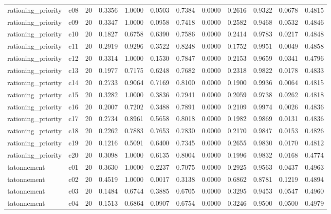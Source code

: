 \begin{table}[htbp]
\begin{tabular}{lrrrrrrrrrrr}
rationing\_priority & c08 & 20 & 0.3356 & 1.0000 & 0.0503 & 0.7384 & 0.0000 & 0.2616 & 0.9322 & 0.0678 & 0.4815 \\
rationing\_priority & c09 & 20 & 0.3347 & 1.0000 & 0.0958 & 0.7418 & 0.0000 & 0.2582 & 0.9468 & 0.0532 & 0.4846 \\
rationing\_priority & c10 & 20 & 0.1827 & 0.6758 & 0.6390 & 0.7586 & 0.0000 & 0.2414 & 0.9783 & 0.0217 & 0.4848 \\
rationing\_priority & c11 & 20 & 0.2919 & 0.9296 & 0.3522 & 0.8248 & 0.0000 & 0.1752 & 0.9951 & 0.0049 & 0.4858 \\
rationing\_priority & c12 & 20 & 0.3314 & 1.0000 & 0.1530 & 0.7847 & 0.0000 & 0.2153 & 0.9659 & 0.0341 & 0.4796 \\
rationing\_priority & c13 & 20 & 0.1977 & 0.7175 & 0.6248 & 0.7682 & 0.0000 & 0.2318 & 0.9822 & 0.0178 & 0.4833 \\
rationing\_priority & c14 & 20 & 0.2733 & 0.9064 & 0.7169 & 0.8100 & 0.0000 & 0.1900 & 0.9936 & 0.0064 & 0.4815 \\
rationing\_priority & c15 & 20 & 0.3282 & 1.0000 & 0.3836 & 0.7941 & 0.0000 & 0.2059 & 0.9738 & 0.0262 & 0.4818 \\
rationing\_priority & c16 & 20 & 0.2007 & 0.7202 & 0.3488 & 0.7891 & 0.0000 & 0.2109 & 0.9974 & 0.0026 & 0.4836 \\
rationing\_priority & c17 & 20 & 0.2734 & 0.8961 & 0.5658 & 0.8018 & 0.0000 & 0.1982 & 0.9869 & 0.0131 & 0.4836 \\
rationing\_priority & c18 & 20 & 0.2262 & 0.7883 & 0.7653 & 0.7830 & 0.0000 & 0.2170 & 0.9847 & 0.0153 & 0.4826 \\
rationing\_priority & c19 & 20 & 0.1216 & 0.5091 & 0.6400 & 0.7345 & 0.0000 & 0.2655 & 0.9830 & 0.0170 & 0.4812 \\
rationing\_priority & c20 & 20 & 0.3098 & 1.0000 & 0.6135 & 0.8004 & 0.0000 & 0.1996 & 0.9832 & 0.0168 & 0.4774 \\
tatonnement & c01 & 20 & 0.3630 & 1.0000 & 0.2237 & 0.7075 & 0.0000 & 0.2925 & 0.9563 & 0.0437 & 0.4963 \\
tatonnement & c02 & 20 & 0.4519 & 1.0000 & 0.0017 & 0.3138 & 0.0000 & 0.6862 & 0.8781 & 0.1219 & 0.4894 \\
tatonnement & c03 & 20 & 0.1484 & 0.6744 & 0.3885 & 0.6705 & 0.0000 & 0.3295 & 0.9453 & 0.0547 & 0.4960 \\
tatonnement & c04 & 20 & 0.1513 & 0.6864 & 0.0907 & 0.6754 & 0.0000 & 0.3246 & 0.9500 & 0.0500 & 0.4979 \\

\end{tabular}
\end{table}
